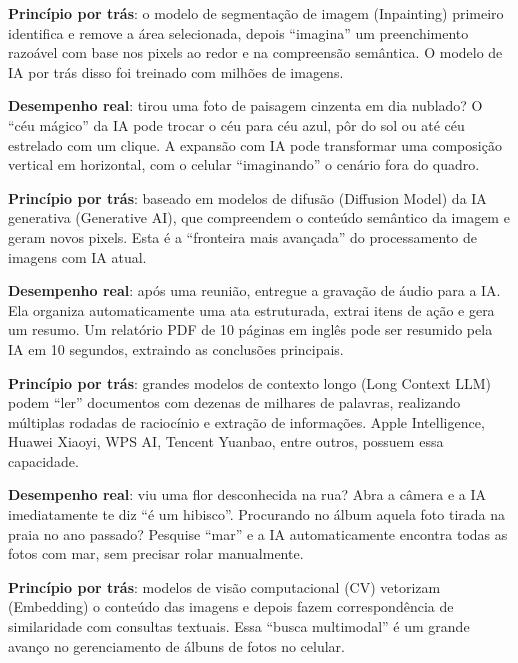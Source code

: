 \textbf{Princípio por trás}: o modelo de segmentação de imagem (Inpainting) primeiro identifica e remove a área selecionada, depois “imagina” um preenchimento razoável com base nos pixels ao redor e na compreensão semântica. O modelo de IA por trás disso foi treinado com milhões de imagens.


\textbf{Desempenho real}: tirou uma foto de paisagem cinzenta em dia nublado? O “céu mágico” da IA pode trocar o céu para céu azul, pôr do sol ou até céu estrelado com um clique. A expansão com IA pode transformar uma composição vertical em horizontal, com o celular “imaginando” o cenário fora do quadro.

\textbf{Princípio por trás}: baseado em modelos de difusão (Diffusion Model) da IA generativa (Generative AI), que compreendem o conteúdo semântico da imagem e geram novos pixels. Esta é a “fronteira mais avançada” do processamento de imagens com IA atual.


\textbf{Desempenho real}: após uma reunião, entregue a gravação de áudio para a IA. Ela organiza automaticamente uma ata estruturada, extrai itens de ação e gera um resumo. Um relatório PDF de 10 páginas em inglês pode ser resumido pela IA em 10 segundos, extraindo as conclusões principais.

\textbf{Princípio por trás}: grandes modelos de contexto longo (Long Context LLM) podem “ler” documentos com dezenas de milhares de palavras, realizando múltiplas rodadas de raciocínio e extração de informações. Apple Intelligence, Huawei Xiaoyi, WPS AI, Tencent Yuanbao, entre outros, possuem essa capacidade.


\textbf{Desempenho real}: viu uma flor desconhecida na rua? Abra a câmera e a IA imediatamente te diz “é um hibisco”. Procurando no álbum aquela foto tirada na praia no ano passado? Pesquise “mar” e a IA automaticamente encontra todas as fotos com mar, sem precisar rolar manualmente.

\textbf{Princípio por trás}: modelos de visão computacional (CV) vetorizam (Embedding) o conteúdo das imagens e depois fazem correspondência de similaridade com consultas textuais. Essa “busca multimodal” é um grande avanço no gerenciamento de álbuns de fotos no celular.

